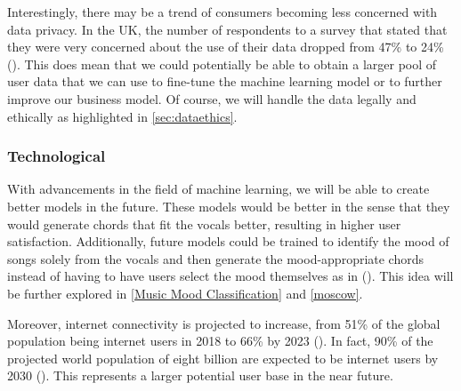   Interestingly, there may be a trend of consumers becoming less concerned with data privacy. In the UK, the number of respondents to a survey that stated that they were very concerned about the use of their data dropped from 47\% to 24\% (\cite{DeloitteData}). This does mean that we could potentially be able to obtain a larger pool of user data that we can use to fine-tune the machine learning model or to further improve our business model. Of course, we will handle the data legally and ethically as highlighted in \cref{sec:dataethics}.

  \subsubsection{Technological}
  With advancements in the field of machine learning, we will be able to create better models in the future. These models would be better in the sense that they would generate chords that fit the vocals better, resulting in higher user satisfaction. Additionally, future models could be trained to identify the mood of songs solely from the vocals and then generate the mood-appropriate chords instead of having to have users select the mood themselves as in (\cite{MySong}). This idea will be further explored in \cref{Music Mood Classification} and \cref{moscow}.

  Moreover, internet connectivity is projected to increase, from 51\% of the global population being internet users in 2018 to 66\% by 2023 (\cite{cisco_2022}). In fact, 90\% of the projected world population of eight billion are expected to be internet users by 2030 (\cite{cybersecurityventures}). This represents a larger potential user base in the near future.

